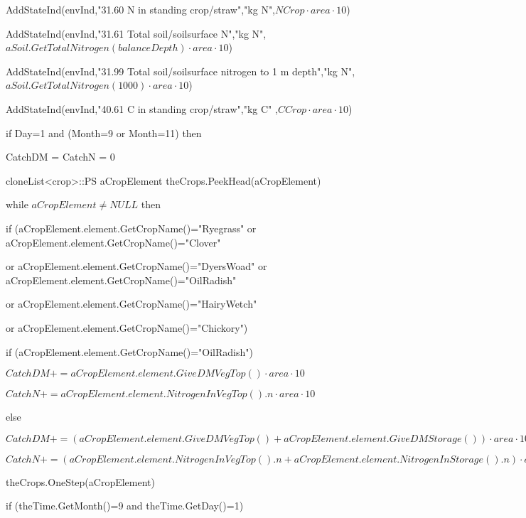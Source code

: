\documentclass[%
]{scrartcl}
\begin{document}
{{{ 
 AddStateInd(envInd,"31.60 N in standing crop/straw","kg N",$NCrop \cdot area \cdot 10$)
 
 AddStateInd(envInd,"31.61 Total soil/soilsurface N","kg N",$aSoil.GetTotalNitrogen(balanceDepth) \cdot area \cdot 10$)
	 
AddStateInd(envInd,"31.99 Total soil/soilsurface nitrogen to 1 m depth","kg N",$aSoil.GetTotalNitrogen(1000) \cdot area \cdot 10$)
   
AddStateInd(envInd,"40.61 C in standing crop/straw","kg C"
,$CCrop \cdot area \cdot 10$)

      if Day=1  and  (Month=9 or Month=11) then
   
        CatchDM = CatchN = 0
        
      cloneList<crop>::PS aCropElement
   	theCrops.PeekHead(aCropElement)
   	
while $aCropElement\ne NULL$ then
      
   \quad            if (aCropElement.element.GetCropName()="Ryegrass" or aCropElement.element.GetCropName()="Clover"

     \quad        	 or  aCropElement.element.GetCropName()="DyersWoad" or aCropElement.element.GetCropName()="OilRadish"

    \quad           or aCropElement.element.GetCropName()="HairyWetch" 

   \quad   or aCropElement.element.GetCropName()="Chickory")
      
   \quad          \quad    	if (aCropElement.element.GetCropName()="OilRadish")
            
    \quad         \quad       \quad  	$CatchDM += aCropElement.element.GiveDMVegTop() \cdot area \cdot 10$
           
     \quad         \quad        \quad  	$CatchN += aCropElement.element.NitrogenInVegTop().n \cdot area \cdot 10$
            
      \quad        \quad      else
            
       \quad         \quad    \quad  	$CatchDM += (aCropElement.element.GiveDMVegTop()+aCropElement.element.GiveDMStorage()) \cdot area \cdot 10$
            
      \quad           \quad   \quad  	$CatchN += (aCropElement.element.NitrogenInVegTop().n+aCropElement.element.NitrogenInStorage().n) \cdot area \cdot 10$
           
        
   \quad   	\quad  		theCrops.OneStep(aCropElement)
      
        	if (theTime.GetMonth()=9  and  theTime.GetDay()=1)
     
}}}
\end{document}
